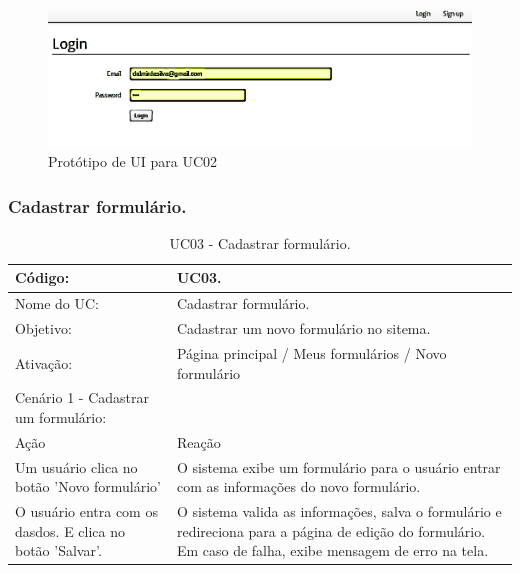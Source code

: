 \documentclass[11pt]{article}
\begin{document}
        \begin{figure}[h!]
          \centering
          \includegraphics[width=.9\textwidth]{authenticate_user.png}
          \caption{Protótipo de UI para UC02}
        \end{figure}

    \clearpage

      \subsubsection{Cadastrar formulário.}

        \begin{table}[h]
          \begin{center}
            \begin{tabular}{ | p{7cm} | p{8cm} | }
              \hline
              Código: \cellcolor{gray} & UC03. \\
              \hline
              Nome do UC: \cellcolor{gray} & Cadastrar formulário. \\
              \hline
              Objetivo: \cellcolor{gray} & Cadastrar um novo formulário no sitema. \\
              \hline
              Ativação: \cellcolor{gray} & Página principal / Meus formulários / Novo formulário \\
              \hline
              \hline
              Cenário 1 - Cadastrar um formulário: &  \\
              \hline
              Ação\cellcolor{gray} & Reação\cellcolor{gray} \\
              \hline
              Um usuário clica no botão 'Novo formulário' & O sistema exibe um formulário para o usuário entrar com as informações do novo formulário. \\
              \hline
              O usuário entra com os dasdos. E clica no botão 'Salvar'. & O sistema valida as informações, salva o formulário e redireciona para a página de edição do formulário. Em caso de falha, exibe mensagem de erro na tela. \\
              \hline
            \end{tabular}
            \caption{UC03 - Cadastrar formulário.}
          \end{center}
        \end{table}
        
\end{document}
